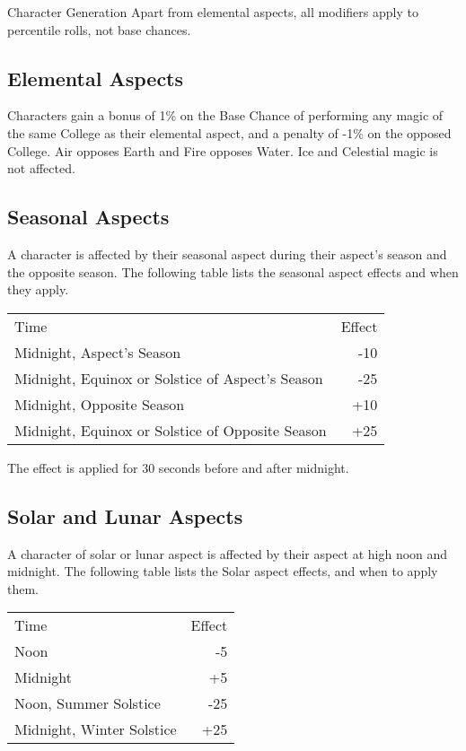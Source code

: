 \begin{Chapter}{Character Generation}
Apart from elemental aspects, all modifiers apply to percentile rolls,
not base chances.

\subsection{Elemental Aspects}

Characters gain a bonus of 1\% on the Base Chance of performing any
magic of the same College as their elemental aspect, and a penalty of
-1\% on the opposed College.  Air opposes Earth and Fire opposes
Water.  Ice and Celestial magic is not affected.

\subsection{Seasonal Aspects}

A character is affected by their seasonal aspect during their aspect’s
season and the opposite season.  The following table lists the
seasonal aspect effects and when they apply.

\begin{tabularx}{\columnwidth}{Xr}
Time							& Effect \\
Midnight, Aspect’s Season				& -10 \\
Midnight, Equinox or Solstice of Aspect’s Season	& -25 \\
Midnight, Opposite Season				& +10 \\
Midnight, Equinox or Solstice of Opposite Season	& +25 \\
\end{tabularx}

The effect is applied for 30 seconds before and after midnight.

\subsection{Solar and Lunar Aspects}

A character of solar or lunar aspect is affected by their aspect at
high noon and midnight. The following table lists the Solar aspect
effects, and when to apply them.

\begin{tabularx}{\columnwidth}{Xr}
Time				& Effect \\
Noon				& -5 \\
Midnight			& +5 \\
Noon, Summer Solstice		& -25 \\
Midnight, Winter Solstice	& +25 \\
\end{tabularx}


\end{Chapter}
